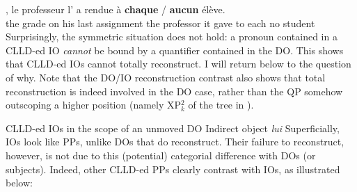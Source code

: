 \documentclass[output=paper]{langsci/langscibook}
\begin{document}
\ea
    ,       le     professeur        l' {a rendue}
\`{a}  \textbf{chaque} / \textbf{aucun}   \'{e}l\`{e}ve.\\
    {}  the    grade  on  his    last       assignment  the   professor   it
     gave      to  each {} no        student\\
\z
%
Surprisingly, the symmetric situation does not hold: a pronoun contained in a
\gls{CLLD}-ed IO {\it cannot} be bound by a quantifier contained in the DO.
This shows that  \gls{CLLD}-ed \glspl{IO} cannot totally reconstruct.
I will return below to the question of why. Note that the DO/IO reconstruction
contrast also shows that total reconstruction is indeed involved in the DO
case, rather than the QP somehow outscoping a higher position (namely XP$_k^2$
of the tree in ).

\ea * CLLD-ed IOs in the scope of an unmoved DO \hfill{Indirect object  {\it lui}} \label{scofree}
\z
\z
%
Superficially, \glspl{IO} look like PPs, unlike \glspl{DO} that do reconstruct.
Their failure to reconstruct, however, is not due to this (potential)
categorial difference with \glspl{DO} (or subjects). Indeed, other
\gls{CLLD}-ed PPs clearly contrast with \glspl{IO}, as illustrated below:
\end{document}
